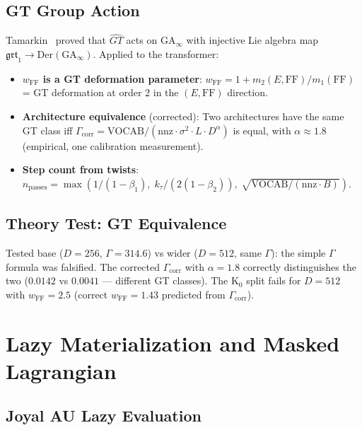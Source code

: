 \documentclass[11pt]{amsart}
\begin{document}
\subsection{GT Group Action}

Tamarkin~\cite{tamarkin0202039} proved that $\widehat{GT}$ acts on
$\mathrm{GA}_\infty$ with injective Lie algebra map
$\mathfrak{grt}_1 \to \mathrm{Der}(\mathrm{GA}_\infty)$.
Applied to the transformer:

\begin{itemize}
\item \textbf{$w_\mathrm{FF}$ is a GT deformation parameter}:
  $w_\mathrm{FF} = 1 + m_2(E,\mathrm{FF})/m_1(\mathrm{FF})$
  = GT deformation at order 2 in the $(E,\mathrm{FF})$ direction.
\item \textbf{Architecture equivalence} (corrected):
  Two architectures have the same GT class iff
  $\Gamma_\mathrm{corr} = \mathrm{VOCAB}/(\mathrm{nnz}\cdot\sigma^2\cdot L\cdot D^\alpha)$
  is equal, with $\alpha\approx 1.8$ (empirical, one calibration measurement).
\item \textbf{Step count from twists}:
  $n_\mathrm{passes} = \max(1/(1-\beta_1),\; k_\tau/(2(1-\beta_2)),\;
  \sqrt{\mathrm{VOCAB}/(\mathrm{nnz}\cdot B)})$.
\end{itemize}

\subsection{Theory Test: GT Equivalence}

Tested base ($D=256$, $\Gamma=314.6$) vs wider ($D=512$, same $\Gamma$):
the simple $\Gamma$ formula was falsified.
The corrected $\Gamma_\mathrm{corr}$ with $\alpha=1.8$ correctly
distinguishes the two ($0.0142$ vs $0.0041$ --- different GT classes).
The K$_0$ split fails for $D=512$ with $w_\mathrm{FF}=2.5$
(correct $w_\mathrm{FF}=1.43$ predicted from $\Gamma_\mathrm{corr}$).

\section{Lazy Materialization and Masked Lagrangian}
\label{sec:lazy}

\subsection{Joyal AU Lazy Evaluation}
\end{document}
